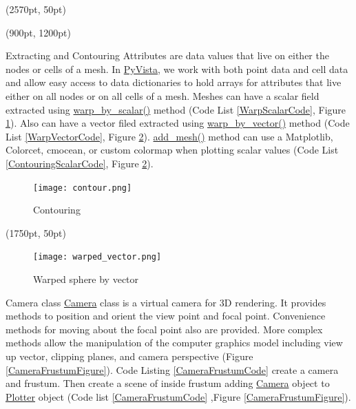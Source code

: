 \documentclass[final]{beamer}
\begin{document}
\begin{frame}[fragile]
\begin{textblock*}{800pt}(2570pt, 50pt)
\end{textblock*}

\begin{textblock*}{800pt}(900pt, 1200pt)
\begin{block}{Extracting and Contouring}
Attributes are data values that live on either the nodes or cells of a mesh.
In \href{https://pypi.org/project/pyvista/}{PyVista}, we work with both point data and cell data and allow easy access to data dictionaries to hold arrays for attributes that live either on all nodes or on all cells of a mesh.
Meshes can have a scalar field extracted
using \href{https://dev.pyvista.org/core/filters.html#pyvista.DataSetFilters.warp_by_scalar}{warp\_by\_scalar()} method
(Code List \ref{WarpScalarCode}, Figure \ref{WarpScalarFigure}).
Also can have a vector filed extracted
using \href{https://dev.pyvista.org/core/filters.html#pyvista.DataSetFilters.warp_by_vector}{warp\_by\_vector()} method
(Code List \ref{WarpVectorCode}, Figure \ref{WarpVectorFigure}).
\href{https://dev.pyvista.org/plotting/plotting.html#pyvista.BasePlotter.add\_mesh}{add\_mesh()} method can use a Matplotlib, Colorcet, cmocean, or custom colormap when plotting scalar values
(Code List \ref{ContouringScalarCode}, Figure \ref{WarpVectorFigure}).


\begin{figure}
\texttt{[image: contour.png]}
\caption{Contouring\label{WarpScalarFigure}}
\end{figure}
\end{block}
\end{textblock*}

\begin{textblock*}{800pt}(1750pt, 50pt)

\begin{figure}
\texttt{[image: warped\_vector.png]}
\caption{Warped sphere by vector\label{WarpVectorFigure}}
\end{figure}
\begin{block}{Camera class}
\href{https://dev.pyvista.org/core/camera.html}{Camera} class is a virtual camera for 3D rendering.
It provides methods to position and orient the view point and focal point.
Convenience methods for moving about the focal point also are provided.
More complex methods allow the manipulation of the computer graphics model including view up vector, clipping planes, and camera perspective (Figure \ref{CameraFrustumFigure}).
Code Listing \ref{CameraFrustumCode} create a camera and frustum.
Then create a scene of inside frustum adding \href{https://dev.pyvista.org/core/camera.html}{Camera} object to \href{https://dev.pyvista.org/plotting/plotting.html#pyvista.Plotter}{Plotter} object
(Code list \ref{CameraFrustumCode} ,Figure \ref{CameraFrustumFigure}).


\end{block}
\end{textblock*}
\end{frame}
\end{document}
